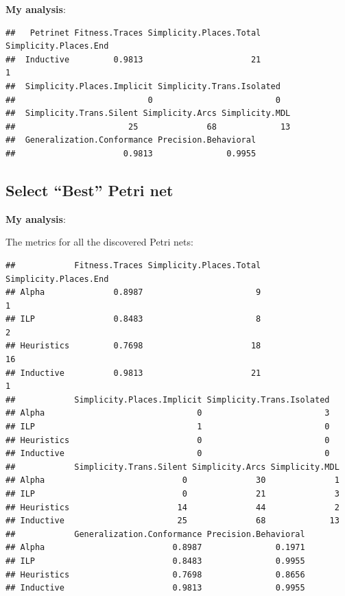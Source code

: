 \documentclass[]{article}
\begin{document}
\textbf{My analysis}:

\begin{verbatim}
##   Petrinet Fitness.Traces Simplicity.Places.Total Simplicity.Places.End
##  Inductive         0.9813                      21                     1
##  Simplicity.Places.Implicit Simplicity.Trans.Isolated
##                           0                         0
##  Simplicity.Trans.Silent Simplicity.Arcs Simplicity.MDL
##                       25              68             13
##  Generalization.Conformance Precision.Behavioral
##                      0.9813               0.9955
\end{verbatim}

\subsection{Select ``Best'' Petri net}\label{select-best-petri-net}

\textbf{My analysis}:

The metrics for all the discovered Petri nets:

\begin{verbatim}
##            Fitness.Traces Simplicity.Places.Total Simplicity.Places.End
## Alpha              0.8987                       9                     1
## ILP                0.8483                       8                     2
## Heuristics         0.7698                      18                    16
## Inductive          0.9813                      21                     1
##            Simplicity.Places.Implicit Simplicity.Trans.Isolated
## Alpha                               0                         3
## ILP                                 1                         0
## Heuristics                          0                         0
## Inductive                           0                         0
##            Simplicity.Trans.Silent Simplicity.Arcs Simplicity.MDL
## Alpha                            0              30              1
## ILP                              0              21              3
## Heuristics                      14              44              2
## Inductive                       25              68             13
##            Generalization.Conformance Precision.Behavioral
## Alpha                          0.8987               0.1971
## ILP                            0.8483               0.9955
## Heuristics                     0.7698               0.8656
## Inductive                      0.9813               0.9955
\end{verbatim}
\end{document}
